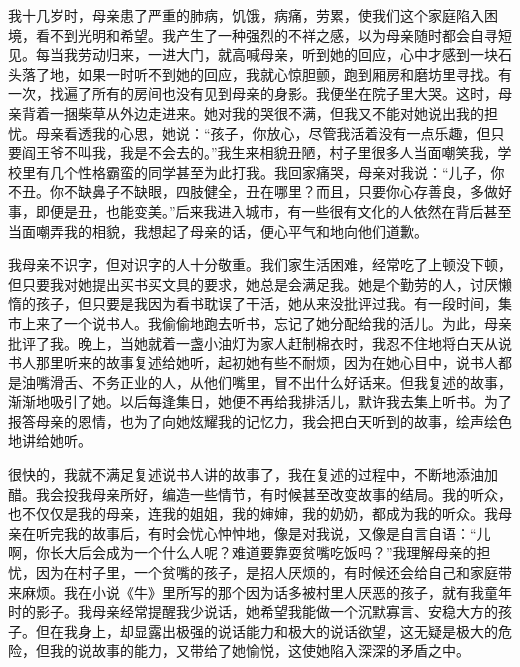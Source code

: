 \documentclass[12pt,a5paper]{ctexbook}
\begin{document}
我十几岁时，母亲患了严重的肺病，饥饿，病痛，劳累，使我们这个家庭陷入困境，看不到光明和希望。我产生了一种强烈的不祥之感，以为母亲随时都会自寻短见。每当我劳动归来，一进大门，就高喊母亲，听到她的回应，心中才感到一块石头落了地，如果一时听不到她的回应，我就心惊胆颤，跑到厢房和磨坊里寻找。有一次，找遍了所有的房间也没有见到母亲的身影。我便坐在院子里大哭。这时，母亲背着一捆柴草从外边走进来。她对我的哭很不满，但我又不能对她说出我的担忧。母亲看透我的心思，她说：“孩子，你放心，尽管我活着没有一点乐趣，但只要阎王爷不叫我，我是不会去的。”我生来相貌丑陋，村子里很多人当面嘲笑我，学校里有几个性格霸蛮的同学甚至为此打我。我回家痛哭，母亲对我说：“儿子，你不丑。你不缺鼻子不缺眼，四肢健全，丑在哪里？而且，只要你心存善良，多做好事，即便是丑，也能变美。”后来我进入城市，有一些很有文化的人依然在背后甚至当面嘲弄我的相貌，我想起了母亲的话，便心平气和地向他们道歉。

我母亲不识字，但对识字的人十分敬重。我们家生活困难，经常吃了上顿没下顿，但只要我对她提出买书买文具的要求，她总是会满足我。她是个勤劳的人，讨厌懒惰的孩子，但只要是我因为看书耽误了干活，她从来没批评过我。有一段时间，集市上来了一个说书人。我偷偷地跑去听书，忘记了她分配给我的活儿。为此，母亲批评了我。晚上，当她就着一盏小油灯为家人赶制棉衣时，我忍不住地将白天从说书人那里听来的故事复述给她听，起初她有些不耐烦，因为在她心目中，说书人都是油嘴滑舌、不务正业的人，从他们嘴里，冒不出什么好话来。但我复述的故事，渐渐地吸引了她。以后每逢集日，她便不再给我排活儿，默许我去集上听书。为了报答母亲的恩情，也为了向她炫耀我的记忆力，我会把白天听到的故事，绘声绘色地讲给她听。

很快的，我就不满足复述说书人讲的故事了，我在复述的过程中，不断地添油加醋。我会投我母亲所好，编造一些情节，有时候甚至改变故事的结局。我的听众，也不仅仅是我的母亲，连我的姐姐，我的婶婶，我的奶奶，都成为我的听众。我母亲在听完我的故事后，有时会忧心忡忡地，像是对我说，又像是自言自语：“儿啊，你长大后会成为一个什么人呢？难道要靠耍贫嘴吃饭吗？”我理解母亲的担忧，因为在村子里，一个贫嘴的孩子，是招人厌烦的，有时候还会给自己和家庭带来麻烦。我在小说《牛》里所写的那个因为话多被村里人厌恶的孩子，就有我童年时的影子。我母亲经常提醒我少说话，她希望我能做一个沉默寡言、安稳大方的孩子。但在我身上，却显露出极强的说话能力和极大的说话欲望，这无疑是极大的危险，但我的说故事的能力，又带给了她愉悦，这使她陷入深深的矛盾之中。
\end{document}
